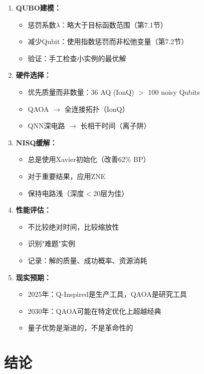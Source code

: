 \documentclass[11pt,a4paper]{article}
\begin{document}
\begin{enumerate}
\item \textbf{QUBO建模：}
\begin{itemize}
\item 惩罚系数$\lambda$：略大于目标函数范围（第7.1节）
\item 减少Qubit：使用指数惩罚而非松弛变量（第7.2节）
\item 验证：手工检查小实例的最优解
\end{itemize}

\item \textbf{硬件选择：}
\begin{itemize}
\item 优先质量而非数量：36 AQ (IonQ) $>$ 100 noisy Qubits
\item QAOA $\rightarrow$ 全连接拓扑（IonQ）
\item QNN深电路 $\rightarrow$ 长相干时间（离子阱）
\end{itemize}

\item \textbf{NISQ缓解：}
\begin{itemize}
\item 总是使用Xavier初始化（改善62\% BP）
\item 对于重要结果，应用ZNE
\item 保持电路浅（深度$<$20层为佳）
\end{itemize}

\item \textbf{性能评估：}
\begin{itemize}
\item 不比较绝对时间，比较缩放性
\item 识别"难题"实例
\item 记录：解的质量、成功概率、资源消耗
\end{itemize}

\item \textbf{现实预期：}
\begin{itemize}
\item 2025年：Q-Inspired是生产工具，QAOA是研究工具
\item 2030年：QAOA可能在特定优化上超越经典
\item 量子优势是渐进的，不是革命性的
\end{itemize}
\end{enumerate}

\section{结论}
\end{document}
